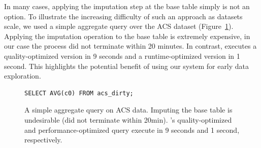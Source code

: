 In many cases, applying the imputation step at the base table simply is not an option. To illustrate the increasing difficulty of such an approach
as datasets scale, we used a simple aggregate query over the ACS dataset (Figure~\ref{query-acs}). Applying the imputation operation to the base table
is extremely expensive, in our case the process did not terminate within 20 minutes. In contrast, \ProjectName{} executes a quality-optimized version
in 9 seconds and a runtime-optimized version in 1 second. This highlights the potential benefit of using our system for early data exploration.

\begin{figure}
\begin{lstlisting}
SELECT AVG(c0) FROM acs_dirty;
\end{lstlisting}
\caption{A simple aggregate query on ACS data. Imputing the base table is undesirable (did not terminate within 20min). \ProjectName's
quality-optimized and performance-optimized query execute in 9 seconds and 1 second, respectively.
}
\label{query-acs}
\end{figure}


